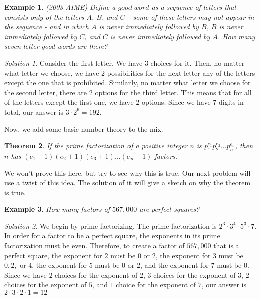 \documentclass[letterpaper]{article}
\newtheorem{thm}{Theorem}[section]
\newtheorem{example}[thm]{Example}
\theoremstyle{remark}
\newtheorem*{solution}{Solution}
\theoremstyle{definition}
\begin{document}
\bigskip

\begin{example}
(2003 AIME) Define a $good~word$ as a sequence of letters that consists only of the letters $A$, $B$, and $C$ - some of these letters may not appear in the sequence - and in which $A$ is never immediately followed by $B$, $B$ is never immediately followed by $C$, and $C$ is never immediately followed by $A$. How many seven-letter good words are there?
\end{example}

\begin{solution}
Consider the first letter. We have $3$ choices for it. Then, no matter what letter we choose, we have $2$ possibilities for the next letter-any of the letters except the one that is prohibited. Similarly, no matter what letter we choose for the second letter, there are $2$ options for the third letter. This means that for all of the letters except the first one, we have $2$ options. Since we have $7$ digits in total, our answer is $3\cdot 2^6=192.$
\end{solution}


Now, we add some basic number theory to the mix. 

\begin{mdframed}
\begin{thm}
If the prime factorization of a positive integer $n$ is \newline $p_1^{e_1}p_2^{e_2} \dots p_n^{e_n}$, then $n$ has $(e_1+1)(e_2+1)(e_3+1)\dots (e_n+1)$ factors.
\end{thm}
\end{mdframed}

We won't prove this here, but try to see why this is true. Our next problem will use a twist of this idea. The solution of it will give a sketch on why the theorem is true.
\begin{example}
How many factors of $567,000$ are perfect squares?
\end{example}

\begin{solution}
We begin by prime factorizing. The prime factorization is $2^3\cdot 3^4 \cdot 5^3 \cdot 7$. In order for a factor to be a perfect square, the exponents in its prime factorization must be even. Therefore, to create a factor of $567,000$ that is a perfect square, the exponent for $2$ must be $0$ or $2$, the exponent for $3$ must be $0,2,$ or $4$, the exponent for $5$ must be $0$ or $2$, and the exponent for $7$ must be $0$. Since we have $2$ choices for the exponent of $2$, $3$ choices for the exponent of $3$, $2$ choices for the exponent of $5$, and $1$ choice for the exponent of $7$, our answer is $2\cdot 3\cdot 2 \cdot 1=12$
\end{solution}
\end{document}
